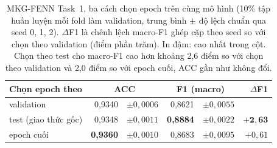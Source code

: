 \documentclass[conference]{IEEEtran}
\newcommand{\hlg}[1]{{\sethlcolor{hlgreen}\hl{#1}}}
\renewcommand{\hl}[1]{#1}
\begin{document}
\begin{table}[t]
\caption{MKG-FENN Task~1, ba cách chọn epoch trên cùng mô hình (10\% tập huấn luyện mỗi fold làm validation,
trung bình ${\pm}$ độ lệch chuẩn qua seed 0, 1, 2). $\Delta$F1 là chênh lệch macro-F1 ghép cặp theo seed so với
chọn theo validation (điểm phần trăm). In đậm: cao nhất trong cột. Chọn theo test \hlg{cho macro-F1 cao hơn} khoảng 2,6 điểm
so với chọn theo validation và 2,0 điểm so với epoch cuối, ACC gần như không đổi.}
\label{tab:fenn-val}
\centering\footnotesize
\setlength{\tabcolsep}{2.5pt}
\begin{tabular}{lr@{\,}lr@{\,}lr}
\toprule
Chọn epoch theo & \multicolumn{2}{c}{ACC} & \multicolumn{2}{c}{F1 (macro)} & $\Delta$F1 \\
\midrule
validation & 0,9340 & ${\pm}0{,}0006$ & 0,8621 & ${\pm}0{,}0055$ & \\
test (giao thức gốc) & 0,9348 & ${\pm}0{,}0011$ & \textbf{0,8884} & ${\pm}0{,}0022$ & $\mathbf{+2{,}63}$ \\
epoch cuối & \textbf{0,9360} & ${\pm}0{,}0010$ & 0,8683 & ${\pm}0{,}0095$ & $+0{,}61$ \\
\bottomrule
\end{tabular}
\end{table}
\end{document}
